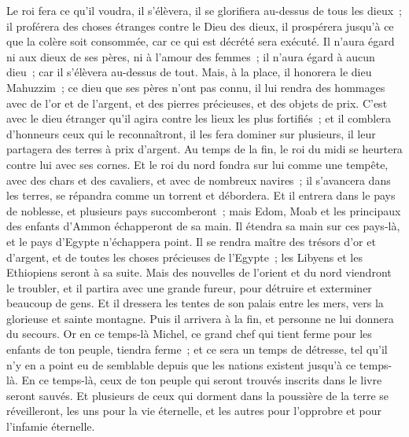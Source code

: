 \begin{multicols}{2}
Le roi fera ce qu'il voudra, il s'élèvera, il se glorifiera au-dessus de tous les dieux~; il proférera des choses étranges contre le Dieu des dieux, il prospérera jusqu'à ce que la colère soit consommée, car ce qui est décrété sera exécuté.
Il n'aura égard ni aux dieux de ses pères, ni à l'amour des femmes~; il n'aura égard à aucun dieu~; car il s'élèvera au-dessus de tout.
Mais, à la place, il honorera le dieu Mahuzzim~; ce dieu que ses pères n'ont pas connu, il lui rendra des hommages avec de l'or et de l'argent, et des pierres précieuses, et des objets de prix.
C'est avec le dieu étranger qu'il agira contre les lieux les plus fortifiés~; et il comblera d'honneurs ceux qui le reconnaîtront, il les fera dominer sur plusieurs, il leur partagera des terres à prix d'argent.
Au temps de la fin, le roi du midi se heurtera contre lui avec ses cornes. Et le roi du nord fondra sur lui comme une tempête, avec des chars et des cavaliers, et avec de nombreux navires~; il s'avancera dans les terres, se répandra comme un torrent et débordera.
Et il entrera dans le pays de noblesse, et plusieurs pays succomberont~; mais Edom, Moab et les principaux des enfants d'Ammon échapperont de sa main.
Il étendra sa main sur ces pays-là, et le pays d'Egypte n'échappera point.
Il se rendra maître des trésors d'or et d'argent, et de toutes les choses précieuses de l'Egypte~; les Libyens et les Ethiopiens seront à sa suite.
Mais des nouvelles de l'orient et du nord viendront le troubler, et il partira avec une grande fureur, pour détruire et exterminer beaucoup de gens.
Et il dressera les tentes de son palais entre les mers, vers la glorieuse et sainte montagne. Puis il arrivera à la fin, et personne ne lui donnera du secours.
\VerseOne{}Or en ce temps-là Michel, ce grand chef qui tient ferme pour les enfants de ton peuple, tiendra ferme~; et ce sera un temps de détresse, tel qu'il n'y en a point eu de semblable depuis que les nations existent jusqu'à ce temps-là. En ce temps-là, ceux de ton peuple qui seront trouvés inscrits dans le livre seront sauvés.
Et plusieurs de ceux qui dorment dans la poussière de la terre se réveilleront, les uns pour la vie éternelle, et les autres pour l'opprobre et pour l'infamie éternelle.

\end{multicols}
